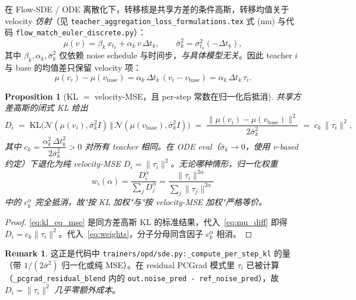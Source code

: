 \documentclass[11pt,a4paper]{article}
\newcommand{\KL}{\mathrm{KL}}
\newcommand{\N}{\mathcal{N}}
\newcommand{\vb}{v_{\mathrm{base}}}
\newcommand{\norm}[1]{\lVert #1\rVert}
\theoremstyle{plain}
\newtheorem{proposition}{Proposition}
\theoremstyle{definition}
\newtheorem{remark}{Remark}
\begin{document}
在 Flow-SDE / ODE 离散化下，转移核是共享方差的条件高斯，转移均值关于 velocity \emph{仿射}（见 \texttt{teacher\_aggregation\_loss\_formulations.tex} 式 (mu) 与代码 \texttt{flow\_match\_euler\_discrete.py}）：
\begin{equation}
\mu(v) = \beta_k\, x_{t_k} + \alpha_k\, v\,\Delta t_k,\qquad
\bar\sigma_k^2 = \sigma_{t_k}^2(-\Delta t_k),
\label{eq:mu_affine}
\end{equation}
其中 $\beta_k,\alpha_k,\bar\sigma_k^2$ 仅依赖 noise schedule 与时间步，\emph{与具体模型无关}。因此 teacher $i$ 与 base 的均值差只保留 velocity 项：
\begin{equation}
\mu(v_i)-\mu(\vb) = \alpha_k\,\Delta t_k\,(v_i-\vb) = \alpha_k\,\Delta t_k\,\tau_i.
\label{eq:mu_diff}
\end{equation}

\begin{proposition}[KL $=$ velocity-MSE，且 per-step 常数在归一化后抵消]
\label{prop:kl_mse}
共享方差高斯的闭式 KL 给出
\begin{equation}
D_i \;=\; \KL\bigl(\N(\mu(v_i),\bar\sigma_k^2 I)\,\Vert\,\N(\mu(\vb),\bar\sigma_k^2 I)\bigr)
\;=\; \frac{\norm{\mu(v_i)-\mu(\vb)}^2}{2\bar\sigma_k^2}
\;=\; c_k\,\norm{\tau_i}^2,
\label{eq:kl_eq_mse}
\end{equation}
其中 $c_k = \dfrac{\alpha_k^2\,\Delta t_k^2}{2\bar\sigma_k^2}>0$ 对所有 teacher \emph{相同}。在 ODE eval（$\bar\sigma_k\to0$，使用 v-based 约定）下退化为纯 velocity-MSE $D_i=\norm{\tau_i}^2$。无论哪种情形，归一化权重
\begin{equation}
w_i(\alpha)=\frac{D_i^{\alpha}}{\sum_{j} D_j^{\alpha}}
=\frac{\norm{\tau_i}^{2\alpha}}{\sum_{j}\norm{\tau_j}^{2\alpha}}
\label{eq:weights}
\end{equation}
中的 $c_k^{\alpha}$ \emph{完全抵消}，故"按 KL 加权"与"按 velocity-MSE 加权"严格等价。
\end{proposition}

\begin{proof}
\eqref{eq:kl_eq_mse} 是同方差高斯 KL 的标准结果，代入~\eqref{eq:mu_diff} 即得 $D_i=c_k\norm{\tau_i}^2$。代入~\eqref{eq:weights}，分子分母同含因子 $c_k^\alpha$ 相消。
\end{proof}

\begin{remark}
这正是代码中 \texttt{trainers/opd/sde.py:\_compute\_per\_step\_kl} 的量（带 $1/(2\bar\sigma^2)$ 归一化或纯 MSE）。在 residual PCGrad 模式里 $\tau_i$ 已被计算（\texttt{\_pcgrad\_residual\_blend} 内的 \texttt{out.noise\_pred - ref\_noise\_pred}），故 $D_i=\norm{\tau_i}^2$ \emph{几乎零额外成本}。
\end{remark}
\end{document}
